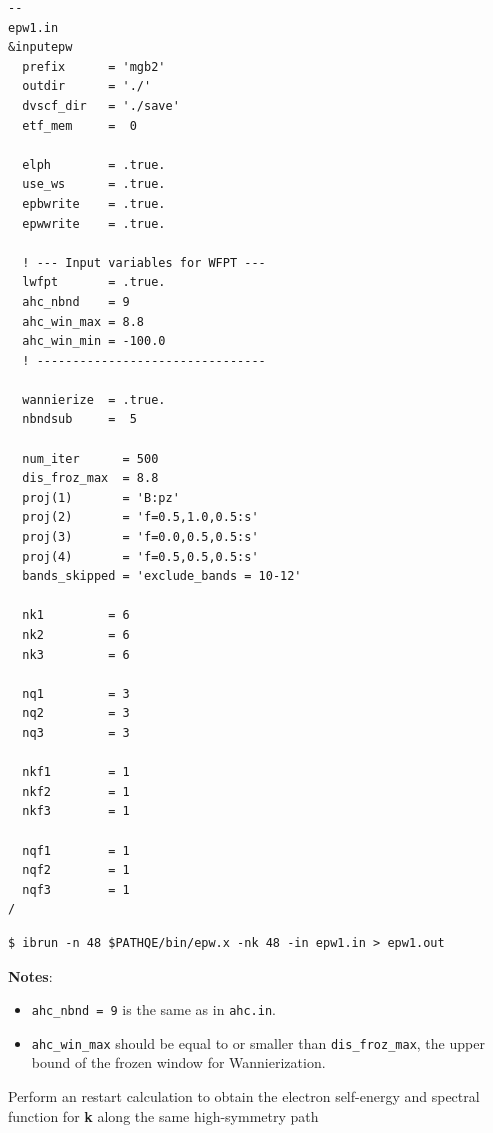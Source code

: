\documentclass[a4paper,11pt,serif]{article}
\begin{document}
\begin{scriptsize}
 \begin{Verbatim}[frame=single]
--                                                                                                 epw1.in
&inputepw
  prefix      = 'mgb2'
  outdir      = './'
  dvscf_dir   = './save'
  etf_mem     =  0

  elph        = .true.
  use_ws      = .true.
  epbwrite    = .true.
  epwwrite    = .true.

  ! --- Input variables for WFPT ---
  lwfpt       = .true.
  ahc_nbnd    = 9
  ahc_win_max = 8.8
  ahc_win_min = -100.0
  ! --------------------------------

  wannierize  = .true.
  nbndsub     =  5

  num_iter      = 500
  dis_froz_max  = 8.8
  proj(1)       = 'B:pz'
  proj(2)       = 'f=0.5,1.0,0.5:s'
  proj(3)       = 'f=0.0,0.5,0.5:s'
  proj(4)       = 'f=0.5,0.5,0.5:s'
  bands_skipped = 'exclude_bands = 10-12'

  nk1         = 6
  nk2         = 6
  nk3         = 6

  nq1         = 3
  nq2         = 3
  nq3         = 3

  nkf1        = 1
  nkf2        = 1
  nkf3        = 1

  nqf1        = 1
  nqf2        = 1
  nqf3        = 1
/
\end{Verbatim}
\end{scriptsize}

\begin{verbatim}
$ ibrun -n 48 $PATHQE/bin/epw.x -nk 48 -in epw1.in > epw1.out
\end{verbatim}


\begin{footnotesize}
{\bf Notes}:
\begin{itemize}
    \item \texttt{ahc\_nbnd = 9} is the same as in \texttt{ahc.in}.
    \item \texttt{ahc\_win\_max} should be equal to or smaller than \texttt{dis\_froz\_max}, the upper bound of the frozen window for Wannierization.
\end{itemize}
\end{footnotesize}



\vspace{0.5cm}

\action Perform an  restart calculation to obtain the electron self-energy and spectral function for \textbf{k} along the same high-symmetry path
\end{document}
